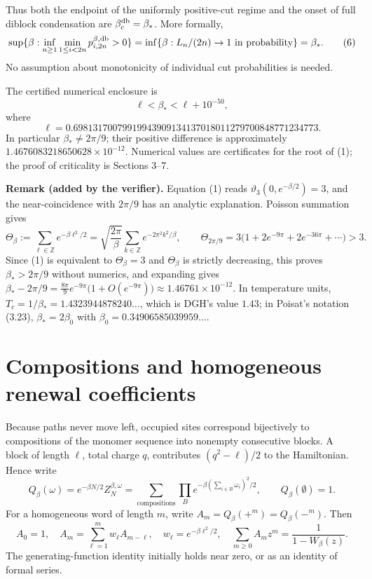 \documentclass[11pt,a4paper]{report}
\begin{document}
Thus both the endpoint of the uniformly positive-cut regime and the onset of full diblock condensation are \(\beta_c^{\rm db}=\beta_*\). More formally,
\[\sup\{\beta:\inf_{n\geq1}\min_{1\leq i<2n}p_{i,2n}^{\beta,\rm db}>0\}
 =\inf\{\beta:L_n/(2n)\to1\text{ in probability}\}=\beta_*.
 \tag{6}\]
No assumption about monotonicity of individual cut probabilities is needed.

The certified numerical enclosure is
\[\ell<\beta_*<\ell+10^{-50},\tag{7}\]
where
\[\ell=0.69813170079919943909134137018011279700848771234773.\]
In particular \(\beta_*\ne2\pi/9\); their positive difference is approximately \(1.4676083218650628\times10^{-12}\). Numerical values are certificates for the root of (1); the proof of criticality is Sections 3--7.

\textbf{Remark (added by the verifier).} Equation (1) reads \(\vartheta_3(0,e^{-\beta/2})=3\), and the near-coincidence with \(2\pi/9\) has an analytic explanation. Poisson summation gives
\[\Theta_\beta:=\sum_{\ell\in\mathbb Z}e^{-\beta\ell^2/2}=\sqrt{\frac{2\pi}{\beta}}\sum_{k\in\mathbb Z}e^{-2\pi^2k^2/\beta},
 \qquad \Theta_{2\pi/9}=3\bigl(1+2e^{-9\pi}+2e^{-36\pi}+\cdots\bigr)>3.\]
Since (1) is equivalent to \(\Theta_\beta=3\) and \(\Theta_\beta\) is strictly decreasing, this proves \(\beta_*>2\pi/9\) without numerics, and expanding gives
\(\beta_*-2\pi/9=\tfrac{8\pi}{9}e^{-9\pi}\bigl(1+O(e^{-9\pi})\bigr)\approx1.46761\times10^{-12}\). In temperature units, \(T_c=1/\beta_*=1.4323944878240\ldots\), which is DGH's value \(1.43\); in Poisat's notation (3.23), \(\beta_*=2\beta_0\) with \(\beta_0=0.34906585039959\ldots\).

\section{Compositions and homogeneous renewal coefficients}

Because paths never move left, occupied sites correspond bijectively to compositions of the monomer sequence into nonempty consecutive blocks. A block of length \(\ell\), total charge \(q\), contributes \((q^2-\ell)/2\) to the Hamiltonian. Hence write
\[Q_\beta(\omega)=e^{-\beta N/2}Z_N^{\beta,\omega}
 =\sum_{\text{compositions}}\prod_{B}e^{-\beta(\sum_{i\in B}\omega_i)^2/2},
 \qquad Q_\beta(\emptyset)=1.
 \tag{8}\]
For a homogeneous word of length \(m\), write \(A_m=Q_\beta(+^m)=Q_\beta(-^m)\). Then
\[A_0=1,\quad A_m=\sum_{\ell=1}^m w_\ell A_{m-\ell},\quad
 w_\ell=e^{-\beta\ell^2/2},\quad
 \sum_{m\geq0}A_m z^m=\frac1{1-W_\beta(z)}.
 \tag{9}\]
The generating-function identity initially holds near zero, or as an identity of formal series.
\end{document}
